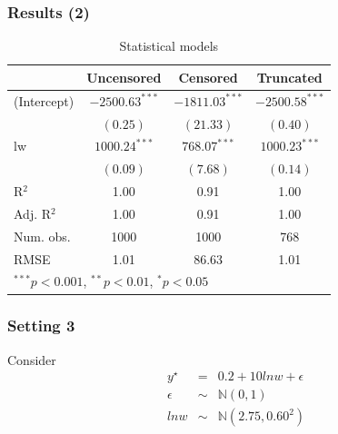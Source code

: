 \documentclass{beamer}
\newcommand{\1}{\mathbb{1}}
\newcommand{\N}{\mathbb{N}}
\begin{document}
\begin{frame}\frametitle{Results (2)}
\tiny
\begin{table}
\begin{center}
\begin{tabular}{l c c c }
\hline
 & Uncensored & Censored & Truncated \\
\hline
(Intercept) & $-2500.63^{***}$ & $-1811.03^{***}$ & $-2500.58^{***}$ \\
            & $(0.25)$         & $(21.33)$        & $(0.40)$         \\
lw          & $1000.24^{***}$  & $768.07^{***}$   & $1000.23^{***}$                 \\
            & $(0.09)$         & $(7.68)$         & $(0.14)$                 \\
\hline
R$^2$       & 1.00             & 0.91             & 1.00             \\
Adj. R$^2$  & 1.00             & 0.91             & 1.00             \\
Num. obs.   & 1000             & 1000             & 768              \\
RMSE        & 1.01             & 86.63            & 1.01             \\
\hline
\multicolumn{4}{l}{\scriptsize{$^{***}p<0.001$, $^{**}p<0.01$, $^*p<0.05$}}
\end{tabular}
\caption{Statistical models}
\label{table:coefficients}
\end{center}
\end{table}
\end{frame}

\begin{frame}\frametitle{Setting 3}
Consider 
\begin{eqnarray}
y^{\star} &=& 0.2 + 10 lnw + \epsilon\\
\epsilon &\sim& \N(0,1)\\
lnw &\sim& \N(2.75,0.60^2)
\end{eqnarray}
\end{frame}
\end{document}
